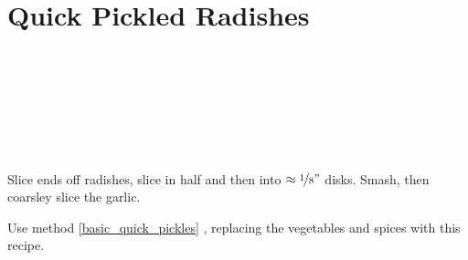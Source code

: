\section[Pickled Radishes]{Quick Pickled Radishes}\label{pickled_radishes}


\begin{ingredientcolumns}[1]
	\begin{ingredientblock}
		\\
		\\
		\\
		\\
		\\
		\\
	\end{ingredientblock}
\end{ingredientcolumns}


\begin{preparation}
\item Slice ends off radishes, slice in half and then into $\approx \nicefrac{1}{8} "$ disks.
	Smash, then coarsley slice the garlic.

\item Use method \ref{basic_quick_pickles} , replacing the vegetables and spices with this recipe.
\end{preparation}


\recipeend
